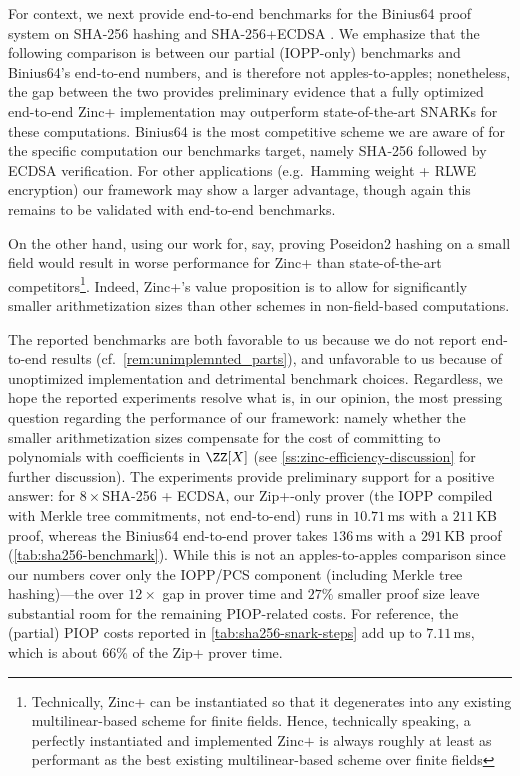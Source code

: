 For context, we next provide end-to-end benchmarks for the Binius64 proof system on SHA-256 hashing and SHA-256+ECDSA \cite{EC:DiaPos25}. We emphasize that the following comparison is between our partial (IOPP-only) benchmarks and Binius64's end-to-end numbers, and is therefore not apples-to-apples; nonetheless, the gap between the two provides preliminary evidence that a fully optimized end-to-end Zinc+ implementation may outperform state-of-the-art SNARKs for these computations. Binius64 is the most competitive scheme we are aware of for the specific computation our benchmarks target, namely SHA-256 followed by ECDSA verification. For other applications (e.g.\ Hamming weight + RLWE encryption) our framework may show a larger advantage, though again this remains to be validated with end-to-end benchmarks.



On the other hand, using our work for, say, proving Poseidon2 hashing on a small field would result in worse performance for Zinc+ than state-of-the-art competitors\footnote{Technically, Zinc+ can be instantiated so that it degenerates into any existing multilinear-based scheme for finite fields. Hence, technically speaking, a perfectly instantiated and implemented Zinc$+$ is always roughly at least as performant as the best existing multilinear-based scheme over finite fields}. Indeed, Zinc+'s value proposition is to allow for significantly smaller arithmetization sizes than other schemes in non-field-based computations. 


\begin{remark}\label{rem:comparison-caveats}
 The reported benchmarks are both favorable to us because we do not report end-to-end results (cf.\ \cref{rem:unimplemnted_parts}), and unfavorable to us because of unoptimized implementation and detrimental benchmark choices. Regardless, we hope the reported experiments resolve what is, in our opinion, the most pressing question regarding the performance of our framework: namely whether the smaller arithmetization sizes compensate for the cost of committing to polynomials with coefficients in $\ZZ[X]$ (see \cref{ss:zinc-efficiency-discussion} for further discussion). The experiments provide preliminary support for a positive answer: for $8\times$SHA-256 + ECDSA, our Zip+-only prover (the IOPP compiled with Merkle tree commitments, not end-to-end) runs in $10.71$\,ms with a $211$\,KB proof, whereas the Binius64 end-to-end prover takes $136$\,ms with a $291$\,KB proof (\cref{tab:sha256-benchmark}). While this is not an apples-to-apples comparison since our numbers cover only the IOPP/PCS component (including Merkle tree hashing)---the over $12\times$ gap in prover time and $27\%$ smaller proof size leave substantial room for the remaining PIOP-related costs. For reference, the (partial) PIOP costs reported in \cref{tab:sha256-snark-steps} add up to $7.11$\,ms, which is about $66\%$ of the Zip+ prover time.
\end{remark}

